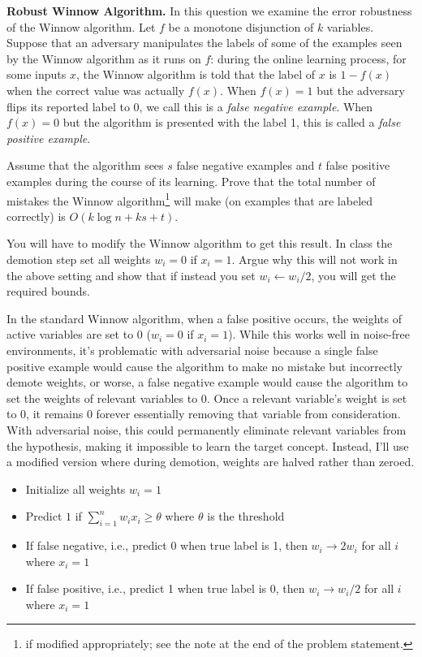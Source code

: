 \documentclass[11pt]{article}
\DeclareMathOperator{\1}{\mathbbm{1}}
\begin{document}
\begin{problem}[15 points] \textbf{Robust Winnow Algorithm.}
	In this question we examine the error robustness of the Winnow algorithm. Let $f$ be a monotone disjunction of $k$ variables. Suppose that an adversary manipulates the labels of some of the examples seen by the Winnow algorithm as it runs on $f$: during the online learning process, for some inputs $x$, the Winnow algorithm is told that the label of $x$ is $1-f(x)$ when the correct value was actually $f(x)$. When $f(x) = 1$ but the adversary flips its reported label to 0, we call this is a \emph{false negative example}. When $f(x) = 0$ but the algorithm is presented with the label 1, this is called a \emph{false positive example}.
	
Assume that the algorithm sees $s$ false negative examples and $t$ false positive examples during the course of its learning. Prove that the total number of mistakes the Winnow algorithm\footnote{if modified appropriately; see the note at the end of the problem statement.} will make (on examples that are labeled correctly) is $O(k \log{n} + ks + t)$.
\end{problem}
\begin{note}
	You will have to modify the Winnow algorithm to get this result. In class
	the demotion step set all weights $w_i = 0$ if $x_i = 1$. Argue why this will
	not work in the above setting and show that if instead you set $w_i \leftarrow
	w_i/2$, you will get the required bounds.
\end{note}

In the standard Winnow algorithm, when a false positive occurs, the weights of active variables are set to $0$ ($w_i = 0$ if $x_i = 1$). While this works well in noise-free environments, it's problematic with adversarial noise because a single false positive example would cause the algorithm to make no mistake but incorrectly demote weights, or worse, a false negative example would cause the algorithm to set the weights of relevant variables to $0$. Once a relevant variable's weight is set to $0$, it remains $0$ forever essentially removing that variable from consideration. With adversarial noise, this could permanently eliminate relevant variables from the hypothesis, making it impossible to learn the target concept. Instead, I'll use a modified version where during demotion, weights are halved rather than zeroed.
\begin{itemize}
	\item Initialize all weights $w_i = 1$
	\item Predict $1$ if $\sum_{i=1}^{n} w_i x_i \geq \theta$ where $\theta$ is the threshold
	\item If false negative, i.e., predict 0 when true label is 1, then $w_i \rightarrow 2w_i$ for all $i$  where $x_i=1$
	\item If false positive, i.e., predict 1 when true label is 0, then $w_i \rightarrow w_i/2$ for all $i$ where $x_i=1$
\end{itemize}
\end{document}
